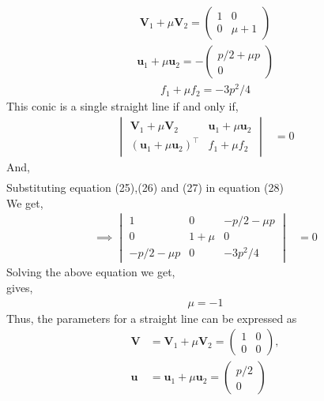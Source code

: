 \documentclass[10pt,a4paper]{report}
\newcommand{\myvec}[1]{\ensuremath{\begin{pmatrix}#1\end{pmatrix}}}
\let\vec\mathbf
\let\vec\mathbf
\newcommand{\mydet}[1]{\ensuremath{\begin{vmatrix}#1\end{vmatrix}}}
\providecommand{\brak}[1]{\ensuremath{\left(#1\right)}}
\begin{document}
\begin{multicols}{2}
\begin{align}
\vec{V}_1+\mu\vec{V}_2= \myvec{
1 & 0\\
0 & \mu+1
}
\end{align}
\begin{align}
\vec{u}_1+\mu\vec{u}_2= -\myvec{
p/2+\mu p\\
0
}
\end{align}
\begin{align}
f_1+\mu f_2= -3p^2/4
\end{align}
This conic is a single straight line if and only if, \\ \vspace{1mm}
\begin{align}
\mydet{\vec{V}_1 + \mu\vec{V}_2 & \vec{u}_1+\mu \vec{u}_2\\ \brak{\vec{u}_1+\mu \vec{u}_2}^{\top} & f_1 + \mu f_2} &= 0
\end{align}
And,\\
\begin{align}
\end{align}
Substituting equation (25),(26) and (27) in equation (28)\\ \vspace{1mm}
We get,\\ \vspace{1mm}
\begin{align}
\implies \mydet{1& 0 & -p/2-\mu p\\ 
0 & 1+\mu & 0 \\
-p/2-\mu p & 0 & -3p^2/4
} &= 0
\end{align}
Solving the above equation we get,\\ \vspace{1mm}
gives,\\ \vspace{1mm}
\begin{align}
    \mu = -1
\end{align}
 Thus, the parameters for a straight line can be expressed as\\ \vspace{1mm}
 \begin{align}
	\vec{V} &= 
\vec{V}_1 + \mu\vec{V}_2
=\myvec{ 1 & 0 \\ 0 & 0},
\\
	\vec{u} &=
\vec{u}_1+\mu \vec{u}_2
	= \myvec{
p/2\\
0
}
\end{align}
\end{multicols}
\end{document}
